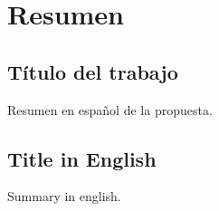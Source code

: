 \chapter*{Resumen}

\section*{Título del trabajo}
Resumen en español de la propuesta.

\section*{Title in English}
Summary in english.
